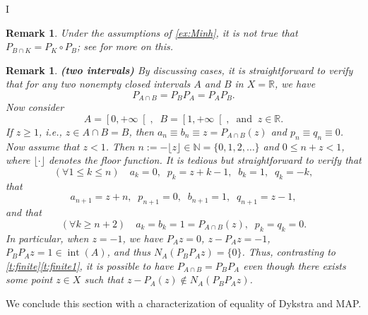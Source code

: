 I\documentclass[12pt]{article}
\newcommand{\RR}{\ensuremath{\mathbb R}}
\newcommand{\NN}{\ensuremath{\mathbb N}}
\newcommand{\inte}{\ensuremath{\operatorname{int}}}
\newcommand{\pinf}{\ensuremath{+\infty}}
\newtheorem{remark}[theorem]{Remark}
\providecommand{\RR}{\mathbb{R}}
\providecommand{\NN}{\mathbb{N}}
\providecommand{\RR}{\mathbb{R}}
\providecommand{\NN}{\mathbb{N}}
\begin{document}
\begin{remark}
Under the assumptions of \cref{ex:Minh},
it is \emph{not} true that $P_{B\cap K} = P_K \circ P_B$;
see \cite[Example~7.5]{Minh} for more on this.
\end{remark}

\begin{remark}{\rm\bf (two intervals)}
By discussing cases, it is straightforward to verify that 
for any two nonempty closed intervals $A$ and $B$
in $X=\RR$, we have 
\begin{equation}
P_{A\cap B} = P_BP_A = P_AP_B.
\end{equation}
Now consider
\begin{equation}
  A = \left[0,\pinf\right[, 
  \;\;
  B = \left[1,\pinf\right[,\;\;
  \text{and}\;\;
  z \in\RR. 
\end{equation}
If $z\geq 1$, i.e., $z\in A\cap B = B$, then 
$a_n\equiv b_n \equiv z = P_{A\cap B}(z)$
and $p_n\equiv q_n\equiv 0$.
Now assume that $z<1$.
Then $n := -\lfloor z\rfloor \in \NN = \{0,1,2,\ldots\}$ and
$0\leq n+z<1$, where $\lfloor\cdot\rfloor$ denotes the floor function. 
It is tedious but straightforward to verify that 
\begin{equation}
(\forall 1\leq k\leq n)\quad 
a_k = 0,\;\;p_k = z+k-1,\;\; b_k=1,\;\;q_k = -k,
\end{equation}
that 
\begin{equation}
a_{n+1} = z+n,\;\; p_{n+1}=0,\;\; 
b_{n+1} = 1,\;\;q_{n+1} =z-1,
\end{equation}
and that 
\begin{equation}
(\forall k\geq n+2)\quad
a_{k}=b_{k}=1=P_{A\cap B}(z),\;\;
p_{k} = q_{k} = 0.
\end{equation}
In particular, when $z=-1$, we have 
$P_Az = 0$, $z-P_Az=-1$, 
$P_BP_Az = 1\in \inte(A)$, and thus 
$N_A(P_BP_Az) = \{0\}$.
Thus, contrasting to \cref{t:finite}\cref{t:finite1}, 
it is possible to have 
$P_{A\cap B}=P_BP_A$ even though
there exists some point $z\in X$ such that $z-P_A(z)\notin N_A(P_BP_Az)$.
\end{remark}

We conclude this section with a characterization of 
equality of Dykstra and MAP.
\end{document}
